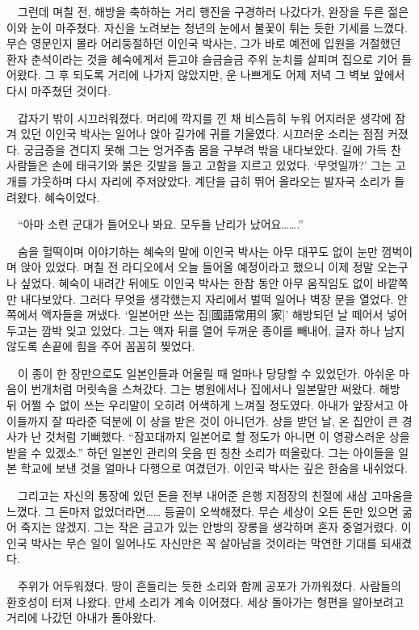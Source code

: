 \documentclass[fs9,seriesRus]{korfarm-base}
\begin{document}
{　그런데 며칠 전, 해방을 축하하는 거리 행진을 구경하러 나갔다가, 완장을 두른 젊은이와 눈이 마주쳤다. 자신을 노려보는 청년의 눈에서 불꽃이 튀는 듯한 기세를 느꼈다. 무슨 영문인지 몰라 어리둥절하던 이인국 박사는, 그가 바로 예전에 입원을 거절했던 환자 춘석이라는 것을 혜숙에게서 듣고야 슬금슬금 주위 눈치를 살피며 집으로 기어 들어왔다. 그 후 되도록 거리에 나가지 않았지만, 운 나쁘게도 어제 저녁 그 벽보 앞에서 다시 마주쳤던 것이다.

　갑자기 밖이 시끄러워졌다. 머리에 깍지를 낀 채 비스듬히 누워 어지러운 생각에 잠겨 있던 이인국 박사는 일어나 앉아 길가에 귀를 기울였다. 시끄러운 소리는 점점 커졌다. 궁금증을 견디지 못해 그는 엉거주춤 몸을 구부려 밖을 내다보았다. 길에 가득 찬 사람들은 손에 태극기와 붉은 깃발을 들고 고함을 지르고 있었다. ‘무엇일까?’ 그는 고개를 갸웃하며 다시 자리에 주저앉았다. 계단을 급히 뛰어 올라오는 발자국 소리가 들려왔다. 혜숙이었다.

　“아마 소련 군대가 들어오나 봐요. 모두들 난리가 났어요…….”

　숨을 헐떡이며 이야기하는 혜숙의 말에 이인국 박사는 아무 대꾸도 없이 눈만 껌벅이며 앉아 있었다. 며칠 전 라디오에서 오늘 들어올 예정이라고 했으니 이제 정말 오는구나 싶었다. 혜숙이 내려간 뒤에도 이인국 박사는 한참 동안 아무 움직임도 없이 바깥쪽만 내다보았다. 그러다 무엇을 생각했는지 자리에서 벌떡 일어나 벽장 문을 열었다. 안쪽에서 액자들을 꺼냈다. ‘일본어만 쓰는 집[國語常用의 家]’ 해방되던 날 떼어서 넣어 두고는 깜박 잊고 있었다. 그는 액자 뒤를 열어 두꺼운 종이를 빼내어, 글자 하나 남지 않도록 손끝에 힘을 주어 꼼꼼히 찢었다.

　이 종이 한 장만으로도 일본인들과 어울릴 때 얼마나 당당할 수 있었던가. 아쉬운 마음이 번개처럼 머릿속을 스쳐갔다. 그는 병원에서나 집에서나 일본말만 써왔다. 해방 뒤 어쩔 수 없이 쓰는 우리말이 오히려 어색하게 느껴질 정도였다. 아내가 앞장서고 아이들까지 잘 따라준 덕분에 이 상을 받은 것이 아니던가. 상을 받던 날, 온 집안이 큰 경사가 난 것처럼 기뻐했다. “잠꼬대까지 일본어로 할 정도가 아니면 이 영광스러운 상을 받을 수 있겠소.” 하던 일본인 관리의 웃음 띤 칭찬 소리가 떠올랐다. 그는 아이들을 일본 학교에 보낸 것을 얼마나 다행으로 여겼던가. 이인국 박사는 깊은 한숨을 내쉬었다.

　그리고는 자신의 통장에 있던 돈을 전부 내어준 은행 지점장의 친절에 새삼 고마움을 느꼈다. 그 돈마저 없었더라면…… 등골이 오싹해졌다. 무슨 세상이 오든 돈만 있으면 굶어 죽지는 않겠지. 그는 작은 금고가 있는 안방의 장롱을 생각하며 혼자 중얼거렸다. 이인국 박사는 무슨 일이 일어나도 자신만은 꼭 살아남을 것이라는 막연한 기대를 되새겼다.

　주위가 어두워졌다. 땅이 흔들리는 듯한 소리와 함께 공포가 가까워졌다. 사람들의 환호성이 터져 나왔다. 만세 소리가 계속 이어졌다. 세상 돌아가는 형편을 알아보려고 거리에 나갔던 아내가 돌아왔다.

}
\end{document}
